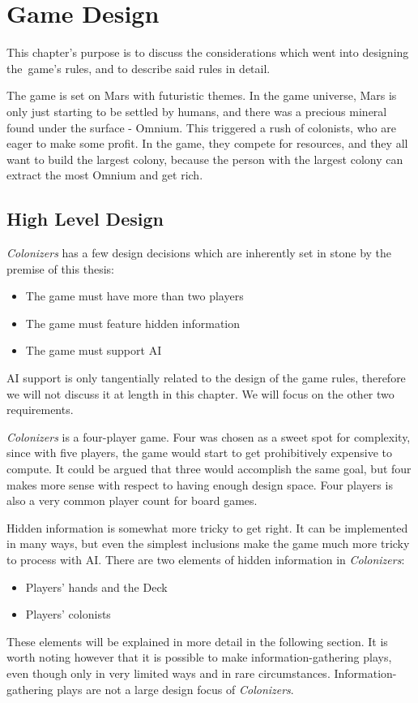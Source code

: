 \chapter{Game Design}
\label{chap:gamedesign}

This chapter's purpose is to discuss the considerations which went into designing
the~game's rules, and to describe said rules in detail.

The game is set on Mars with futuristic themes. In the game universe, Mars
is only just starting to be settled by humans, and there was a precious mineral
found under the surface - Omnium. This triggered a rush of colonists, who are
eager to make some profit. In the game, they compete for resources, and they all
want to build the largest colony, because the person with the largest colony
can extract the most Omnium and get rich.

\section{High Level Design}

\emph{Colonizers} has a few design decisions which are inherently set in stone by the premise
of this thesis:
\begin{itemize}
    \item The game must have more than two players
    \item The game must feature hidden information
    \item The game must support AI
\end{itemize}

AI support is only tangentially related to the design of the game rules, therefore
we will not discuss it at length in this chapter. We will focus on the other two
requirements.

\emph{Colonizers} is a four-player game. Four was chosen as a sweet spot for complexity,
since with five players, the game would start to get prohibitively expensive to compute.
It could be argued that three would accomplish the same goal, but four makes more sense
with respect to having enough design space. Four players is also a very common
player count for board games.

Hidden information is somewhat more tricky to get right. It can be implemented in many
ways, but even the simplest inclusions make the game much more tricky to process
with AI. There are two elements of hidden information in \emph{Colonizers}:
\begin{itemize}
    \item Players' hands and the Deck
    \item Players' colonists
\end{itemize}
These elements will be explained in more detail in the following section. It is worth
noting however that it is possible to make information-gathering plays, even though
only in very limited ways and in rare circumstances. Information-gathering plays
are not a large design focus of \emph{Colonizers}.


